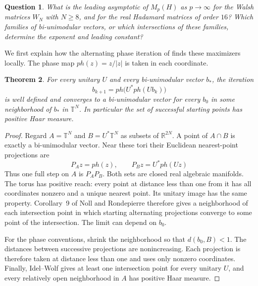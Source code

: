\documentclass[11pt,a4paper]{article}
\newtheorem{thm}{Theorem}[section]
\newtheorem{question}[thm]{Question}
\theoremstyle{remark}
\begin{document}
\begin{samepage}
\begin{question}\label{que:laplace}
What is the leading asymptotic of $M_p(H)$ as $p\to\infty$ for the Walsh
matrices $W_N$ with $N\geq8$, and for the real Hadamard matrices of order
$16$? Which families of bi-unimodular vectors, or which intersections of
these families, determine the exponent and leading constant?
\end{question}
\end{samepage}

We first explain how the alternating phase iteration of \cite{dvb,frz}
finds these maximizers locally. The phase map $ph(z)=z/|z|$ is taken
in each coordinate.

\begin{samepage}
\begin{thm}\label{thm:iteration}
For every unitary $U$ and every bi-unimodular vector $b_*$, the iteration
\[
 b_{k+1}=ph\big(U^*ph(Ub_k)\big)
\]
is well defined and converges to a bi-unimodular vector for every $b_0$
in some neighborhood of $b_*$ in $\mathbb T^N$. In particular the set of
successful starting points has positive Haar measure.
\end{thm}
\end{samepage}
\begin{proof}
Regard $A=\mathbb T^N$ and $B=U^*\mathbb T^N$ as subsets of
$\mathbb R^{2N}$. A point of $A\cap B$ is exactly a bi-unimodular vector.
Near these tori their Euclidean nearest-point projections are
\[
 P_A z=ph(z),\qquad P_B z=U^*ph(Uz)
\]
Thus one full step on $A$ is $P_A P_B$. Both sets are closed real
algebraic manifolds. The torus has positive reach: every point at
distance less than one from it has all coordinates nonzero and a unique
nearest point. Its unitary image has the same property. Corollary~9 of
Noll and Rondepierre \cite{nor} therefore gives a neighborhood of each
intersection point in which starting alternating projections converge to
some point of the intersection. The limit can depend on $b_0$.

For the phase conventions, shrink the neighborhood so that $d(b_0,B)<1$.
The distances between successive projections are nonincreasing. Each
projection is therefore taken at distance less than one and uses only
nonzero coordinates. Finally, Idel--Wolf \cite{iwo} gives at least one
intersection point for every unitary $U$, and every relatively open
neighborhood in $A$ has positive Haar measure.
\end{proof}
\end{document}
